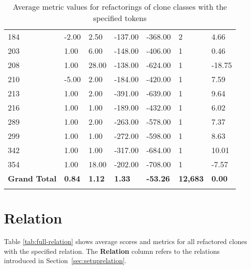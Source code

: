 \begin{appendices}
\begin{longtable}[c]{@{}lllllll@{}}
184 & -2.00 & 2.50 & -137.00 & -368.00 & 2 & 4.66 \\

203 & 1.00 & 6.00 & -148.00 & -406.00 & 1 & 0.46 \\

208 & 1.00 & 28.00 & -138.00 & -624.00 & 1 & -18.75 \\

210 & -5.00 & 2.00 & -184.00 & -420.00 & 1 & 7.59 \\

213 & 1.00 & 2.00 & -391.00 & -639.00 & 1 & 9.64 \\

216 & 1.00 & 1.00 & -189.00 & -432.00 & 1 & 6.02 \\

289 & 1.00 & 2.00 & -263.00 & -578.00 & 1 & 7.37 \\

299 & 1.00 & 1.00 & -272.00 & -598.00 & 1 & 8.63 \\

342 & 1.00 & 1.00 & -317.00 & -684.00 & 1 & 10.01 \\

354 & 1.00 & 18.00 & -202.00 & -708.00 & 1 & -7.57 \\* \midrule
\textbf{Grand Total} & \textbf{0.84} & \textbf{1.12} & \textbf{1.33} & \textbf{-53.26} & \textbf{12,683} & \textbf{0.00} \\* \bottomrule
\caption{Average metric values for refactorings of clone classes with the specified tokens}
\label{tab:full-tokens}\\
\end{longtable}
\newpage

\section{Relation}
Table \ref{tab:full-relation} shows average scores and metrics for all refactored clones with the specified relation. The \textbf{Relation} column refers to the relations introduced in Section~\ref{sec:setuprelation}.


\end{appendices}
